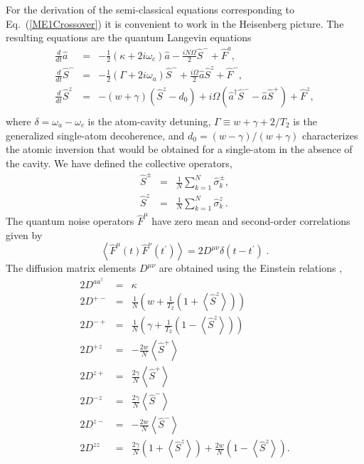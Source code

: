 \documentclass[aps,
twocolumn,
showpacs,
superscriptaddress,groupedaddress]{revtex4}
\begin{document}
For the derivation of the semi-classical equations corresponding to
Eq.~(\ref{ME1Crossover}) it is convenient to work in the Heisenberg
picture.  The resulting equations are the quantum Langevin equations
\begin{eqnarray}
\frac{d}{dt} \hat{a}&=& -\frac{1}{2} (\kappa +2i\omega_c) \hat{a}
-\frac{i N \Omega}{2} \hat{S}^{-}
+\hat{F}^{a},
\label{La}\\
\frac{d}{dt} \hat{S}^{-} &=&
-\frac{1}{2} \left(\Gamma +2 i \omega_a \right)  \hat{S}^{-}
+\frac{i \Omega}{2} \hat{a} \hat{S}^{z}
+\hat{F}^{-},
\label{Lsm}\\
\frac{d}{dt} \hat{S}^{z} &=&
-(w+\gamma)\left( \hat{S}^{z} - d_0\right)
+i\Omega \left( \hat{a}^{\dagger}\hat{S}^{-} -
\hat{a}\hat{S}^{+} \right)
+\hat{F}^{z},\nonumber\\
\label{Lsz}
\end{eqnarray}
where $\delta=\omega_{a}-\omega_{c}$ is the atom-cavity detuning,
$\Gamma \equiv w+\gamma+2/T_2$ is the generalized single-atom
decoherence, and $d_0 = (w-\gamma)/(w+\gamma)$ characterizes the
atomic inversion that would be obtained for a single-atom in the
absence of the cavity. We have defined the collective operators,
\begin{eqnarray}
\hat{S}^{\pm}&=&\frac{1}{N}\sum_{k=1}^N \hat{\sigma}_k^{\pm},
\\
\hat{S}^{z}&=&\frac{1}{N}\sum_{k=1}^N \hat{\sigma}_k^{z}\,.
\end{eqnarray}
The quantum noise operators $\hat F^\mu$ have zero mean and
second-order correlations given by
\begin{equation}
\left< \hat{F}^{\mu}(t) \hat{F}^{\nu}(t^{\prime})\right> =
2 D^{\mu \nu} \delta(t-t^{\prime})\;.
\end{equation}
The diffusion matrix elements $D^{\mu \nu} $ are obtained using the
Einstein relations \cite{meystre2007elements},
\begin{eqnarray}
2D^{a a^{\dagger}}&=& \kappa \\
2D^{+-}&=& \frac{1}{N}
\left(
  w + \frac{1}{T_2} \left(1 + \left< \hat{S}^{z} \right> \right)
\right) \\
2D^{-+}&=& \frac{1}{N}
\left(
  \gamma + \frac{1}{T_2} \left(1- \left< \hat{S}^{z} \right> \right)
\right) \\
2D^{+z}&=& -\frac{2w}{N} \left< \hat{S}^{+} \right>
\\
2D^{z+}&=& \frac{2\gamma}{N} \left< \hat{S}^{+} \right>
\\
2D^{-z}&=& \frac{2\gamma}{N} \left< \hat{S}^{-} \right>
\\
2D^{z-}&=& -\frac{2w}{N} \left< \hat{S}^{-} \right>
\\
2D^{zz}&=& \frac{2\gamma}{N}
\left(1+ \left< \hat{S}^{z} \right> \right) +
\frac{2w}{N}\left(1- \left< \hat{S}^{z} \right> \right).
\label{OpNoise1}
\end{eqnarray}
\end{document}
